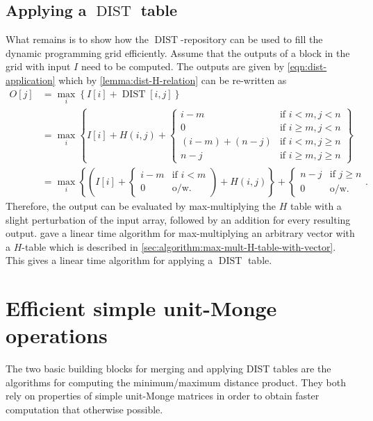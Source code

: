 \documentclass[twoside,11pt,openright]{report}
\newcommand{\DIST}{\operatorname{DIST}}
\begin{document}
\subsection{Applying a $\DIST$ table}
\label{sec:applying-a-dist-table}
What remains is to show how the $\DIST$-repository can be used to fill the dynamic programming grid efficiently. Assume that the outputs of a block in the grid with input $I$ need to be computed. The outputs are given by \cref{eqn:dist-application} which by \cref{lemma:dist-H-relation} can be re-written as
\begin{align*}
  O[j] &= \max_i \left\{ I[i] + \DIST[i, j] \right\} \\
    &= \max_i \left\{ I[i] + H(i, j) + \left\{
      \begin{array}{ll}
        i - m             & \text{if } i < m, j < n \\
        0                 & \text{if } i \geq m, j < n \\
        (i - m) + (n - j) & \text{if } i < m, j \geq n \\
        n - j             & \text{if } i \geq m, j \geq n
      \end{array}
    \right. \right\} \\
    &= \max_i\left\{ \left( I[i] + \left\{
      \begin{array}{ll}
        i - m     & \text{if } i < m \\
        0         & \text{o/w.}
      \end{array}
    \right. \right) + H(i, j) \right\} + \left\{
      \begin{array}{ll}
        n - j     & \text{if } j \geq n \\
        0         & \text{o/w.}
      \end{array}
    \right. .
\end{align*}
Therefore, the output can be evaluated by max-multiplying the $H$ table with a slight perturbation of the input array, followed by an addition for every resulting output. \cite{Gawrychowski:2012:FAC:2422024.2422048} gave a linear time algorithm for max-multiplying an arbitrary vector with a $H$-table which is described in \cref{sec:algorithm:max-mult-H-table-with-vector}. This gives a linear time algorithm for applying a $\DIST$ table.

\section{Efficient simple unit-Monge operations}
The two basic building blocks for merging and applying DIST tables are the algorithms for computing the minimum/maximum distance product. They both rely on properties of simple unit-Monge matrices in order to obtain faster computation that otherwise possible.
\end{document}
